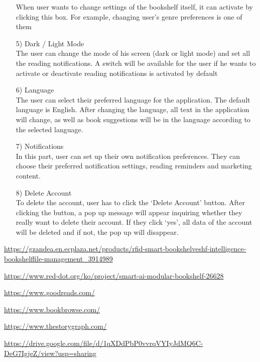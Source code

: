 \documentclass[conference]{IEEEtran}
\begin{document}
\begin{itemize}
    When user wants to change settings of the bookshelf itself, it can activate by clicking this box. For example, changing user’s genre preferences is one of them
    \item[5)] Dark / Light Mode \\
    The user can change the mode of his screen (dark or light mode) and set all the reading notifications. A switch will be available for the user if he wants to activate or deactivate reading notifications is activated by default
    \item[6)] Language \\
    The user can select their preferred language for the application. The default language is English. After changing the language, all text in the application will change, as well as book suggestions will be in the language according to the selected language.
    \item[7)] Notifications \\
    In this part, user can set up their own notification preferences. They can choose their preferred notification settings, reading reminders and marketing content.
    \item[8)] Delete Account \\
    To delete the account, user has to click the ‘Delete Account’ button. After clicking the button, a pop up message will appear inquiring whether they really want to delete their account. If they click ‘yes’, all data of the account will be deleted and if not, the pop up will disappear. 
\end{itemize}








\begin{thebibliography}{00}
\url{https://gzandea.en.ecplaza.net/products/rfid-smart-bookshelveshf-intelligence-bookshelffile-management_3914989}

\url{https://www.red-dot.org/ko/project/smart-ai-modular-bookshelf-26628}

\url{https://www.goodreads.com/}

\url{https://www.bookbrowse.com/}

\url{https://www.thestorygraph.com/}

\url{https://drive.google.com/file/d/1qXDdPbP0vvrqVYIyJdMQ6C-DeG7IgjeZ/view?usp=sharing}

\end{thebibliography}
\end{document}
